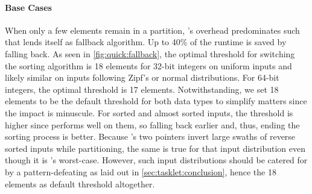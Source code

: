\paragraph{Base Cases}
When only a few elements remain in a partition, \QS{}'s overhead predominates such that \IS{} lends itself as fallback algorithm.
Up to 40\% of the runtime is saved by falling back.
As seen in \cref{fig:quick:fallback}, the optimal threshold for switching the sorting algorithm is 18 elements for 32-bit integers on uniform inputs and likely similar on inputs following Zipf's or normal distributions.
For 64-bit integers, the optimal threshold is 17 elements.
Notwithstanding, we set 18 elements to be the default threshold for both data types to simplify matters since the impact is minuscule.
For sorted and almost sorted inputs, the threshold is higher since \IS{} performs well on them, so falling back earlier and, thus, ending the sorting process is better.
Because \QS{}'s two pointers invert large swaths of reverse sorted inputs while partitioning, the same is true for that input distribution even though it is \IS{}'s worst-case.
However, such input distributions should be catered for by a pattern-defeating \QS{} as laid out in \cref{sec:tasklet:conclusion}, hence the 18 elements as default threshold altogether.

